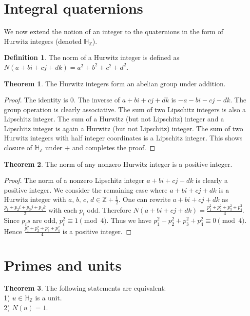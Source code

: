 \documentclass[11pt]{report}
\theoremstyle{plain}
\theoremstyle{definition}
\newtheorem{defn}{Definition}
\newtheorem{theorem}{Theorem}
\begin{document}
\section{Integral quaternions}
We now extend the notion of an integer to the quaternions in the form of Hurwitz integers (denoted $ \mathbb{H}_\mathbb{Z} $).
\begin{defn}
	The norm of a Hurwitz integer is defined as $N(a+bi+cj+dk)=a^2+b^2+c^2+d^2$.
\end{defn}
\begin{theorem}
	The Hurwitz integers form an abelian group under addition.
\end{theorem}
\begin{proof}
	The identity is $ 0 $. The inverse of $ a +bi+ cj+dk $ is $ -a-bi-cj-dk. $ The group operation is clearly associative. The sum of two Lipschitz integers is also a Lipschitz integer. The sum of a Hurwitz (but not Lipschitz) integer and a Lipschitz integer is again a Hurwitz (but not Lipschitz) integer. The sum of two Hurwitz integers with half integer coordinates is a Lipschitz integer. This shows closure of $ \mathbb{H}_{\mathbb{Z}} $ under $ + $ and completes the proof.  
\end{proof}
\begin{theorem}
The norm of any nonzero Hurwitz integer is a positive integer.
\end{theorem}
 \begin{proof}
	 The norm of a nonzero Lipschitz integer $ a+bi+cj+dk $ is clearly a positive integer. We consider the remaining case where $ a+bi+cj+dk $ is a Hurwitz integer with $ a, \,b, \,c, \,d \in \mathbb{Z}+\frac{1}{2}$. One can rewrite $ a+bi+cj+dk $ as $ \frac{p_1+p_2i+p_3j+p_4k}{2} $ with each $ p_i $ odd. Therefore $ N( a+bi+cj+dk ) = \frac{p_1 ^2 +p_2 ^2 +p_3 ^2 + p_4 ^2}{4} . $ Since $ p_i s $ are odd, $ p_i ^2 \equiv 1 \pmod{4}$. Thus we have $ p_1 ^2 +p_2 ^2 +p_3 ^2 + p_4 ^2 \equiv 0 \pmod{4}. $ Hence  $ \frac{p_1 ^2 +p_2 ^2 +p_3 ^2 + p_4 ^2}{4} $ is a positive integer.
 \end{proof}
 \section{Primes and units}
 
\begin{theorem}
	The following statements are equivalent: \\ 
	1) $ u \in \mathbb{H}_\mathbb{Z}$ is a unit.\\
	2) $N(u) = 1. $	 
\end{theorem}
\end{document}
